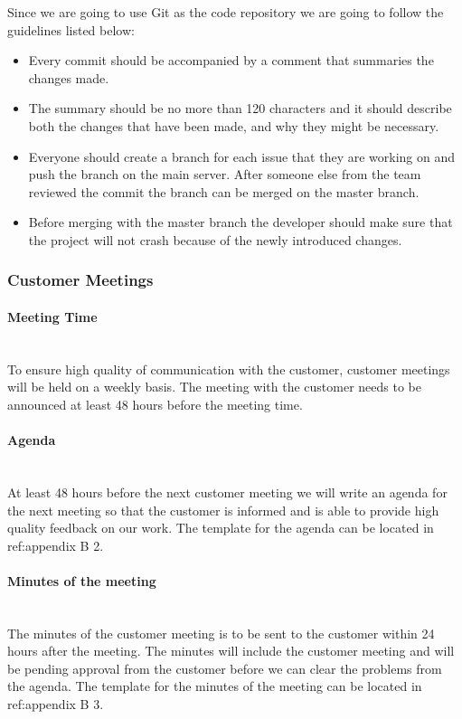 \documentclass[../document.tex]{subfiles}
\begin{document}
Since we are going to use Git as the code repository we are going to follow the guidelines listed below:
\begin{itemize}
\item
Every commit should be accompanied by a comment that summaries the changes made. 
\item
The summary should be no more than 120 characters and it should describe both the changes that have been made, and why they might be necessary.
\item
Everyone should create a branch for each issue that they are working on and push the branch on the main server. After someone else from the team reviewed the commit the branch can be merged on the master branch.
\item
Before merging with the master branch the developer should make sure that the project will not crash because of the newly introduced changes.
\end{itemize}

\subsubsection{Customer Meetings}
\paragraph{Meeting Time} \ \\
To ensure high quality of communication with the customer, customer meetings will be held on a weekly basis. The meeting with the customer needs to be announced at least 48 hours before the meeting time.

\paragraph{Agenda} \ \\
At least 48 hours before the next customer meeting we will write an agenda for the next meeting so that the customer is informed and is able to provide high quality feedback on our work. The template for the agenda can be located in {\color{red} ref:}appendix B 2.

\paragraph{Minutes of the meeting} \ \\
The minutes of the customer meeting is to be sent to the customer within 24 hours after the meeting. The minutes will include the customer meeting and will be pending approval from the customer before we can clear the problems from the agenda. The template for the minutes of the meeting can be located in {\color{red} ref:}appendix B 3.
\end{document}
